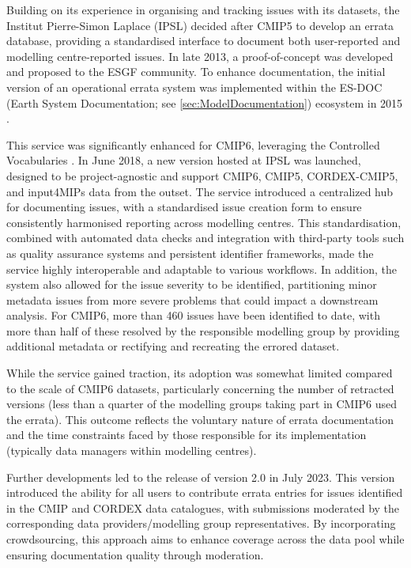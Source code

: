\documentclass[manuscript]{copernicus}
\begin{document}
Building on its experience in organising and tracking issues with its datasets, the Institut Pierre-Simon Laplace (IPSL) decided after CMIP5 to develop an errata database, providing a standardised interface to document both user-reported and modelling centre-reported issues. In late 2013, a proof-of-concept was developed and proposed to the ESGF community. To enhance documentation, the initial version of an operational errata system was implemented within the ES-DOC (Earth System Documentation; see \autoref{sec:ModelDocumentation}) ecosystem in 2015 \citep{pascoe_documenting_2020}.

This service was significantly enhanced for CMIP6, leveraging the Controlled Vocabularies \citep[see \autoref{sec:CMIPCVs};][]{durack_cmip6_2024}. In June 2018, a new version hosted at IPSL was launched, designed to be project-agnostic and support CMIP6, CMIP5, CORDEX-CMIP5, and input4MIPs data from the outset. The service introduced a centralized hub for documenting issues, with a standardised issue creation form to ensure consistently harmonised reporting across modelling centres. This standardisation, combined with automated data checks and integration with third-party tools such as quality assurance systems and persistent identifier frameworks, made the service highly interoperable and adaptable to various workflows. In addition, the system also allowed for the issue severity to be identified, partitioning minor metadata issues from more severe problems that could impact a downstream analysis. For CMIP6, more than 460 issues have been identified to date, with more than half of these resolved by the responsible modelling group by providing additional metadata or rectifying and recreating the errored dataset.

While the service gained traction, its adoption was somewhat limited compared to the scale of CMIP6 datasets, particularly concerning the number of retracted versions (less than a quarter of the modelling groups taking part in CMIP6 used the errata). This outcome reflects the voluntary nature of errata documentation and the time constraints faced by those responsible for its implementation (typically data managers within modelling centres).

Further developments led to the release of version 2.0 in July 2023. This version introduced the ability for all users to contribute errata entries for issues identified in the CMIP and CORDEX data catalogues, with submissions moderated by the corresponding data providers/modelling group representatives. By incorporating crowdsourcing, this approach aims to enhance coverage across the data pool while ensuring documentation quality through moderation.
\end{document}
